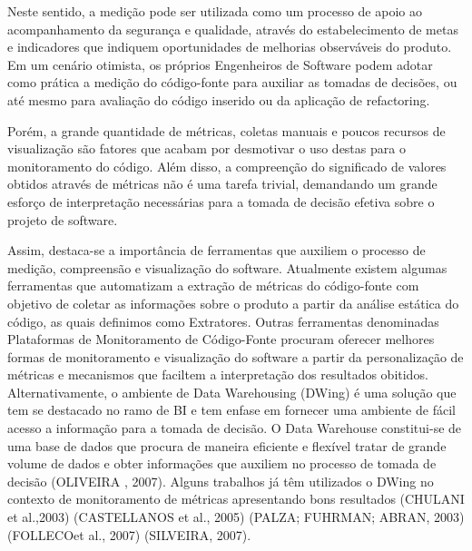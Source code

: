 %

Neste sentido, a medição pode ser utilizada como um processo de apoio ao acompanhamento da segurança e qualidade, através do estabelecimento de metas e indicadores que indiquem oportunidades de melhorias observáveis do produto. Em um cenário otimista, os próprios Engenheiros de Software podem adotar como prática a medição do código-fonte para auxiliar as tomadas de decisões, ou até mesmo para avaliação do código inserido ou da aplicação de refactoring.


Porém, a grande quantidade de métricas, coletas manuais e poucos recursos de visualização são fatores que acabam por desmotivar o uso destas para o monitoramento do código. Além disso, a compreenção do significado de valores obtidos através de métricas não é uma tarefa trivial, demandando um grande esforço de interpretação necessárias para a tomada de decisão efetiva sobre o projeto de software.

%

Assim, destaca-se a importância de ferramentas que auxiliem o processo de medição, compreensão e visualização do software. Atualmente existem algumas ferramentas que automatizam a extração de métricas do código-fonte com objetivo de coletar as informações sobre o produto a partir da análise estática do código, as quais definimos como Extratores. Outras ferramentas denominadas Plataformas de Monitoramento de Código-Fonte procuram oferecer melhores formas de monitoramento e visualização do software a partir da personalização de métricas e mecanismos que faciltem a interpretação dos resultados obitidos. Alternativamente, o ambiente de Data Warehousing (DWing) é uma solução que tem se destacado no ramo de BI e tem enfase em fornecer uma ambiente de fácil acesso a informação para a tomada de decisão. O Data Warehouse constitui-se de uma base de dados que procura de maneira eficiente e flexível tratar de grande volume de dados e obter informações que auxiliem no processo de tomada de decisão (OLIVEIRA , 2007). Alguns trabalhos já têm utilizados o DWing no contexto de monitoramento de métricas apresentando bons resultados (CHULANI et al.,2003) (CASTELLANOS et al., 2005) (PALZA; FUHRMAN; ABRAN, 2003) (FOLLECOet al., 2007) (SILVEIRA, 2007).

%

